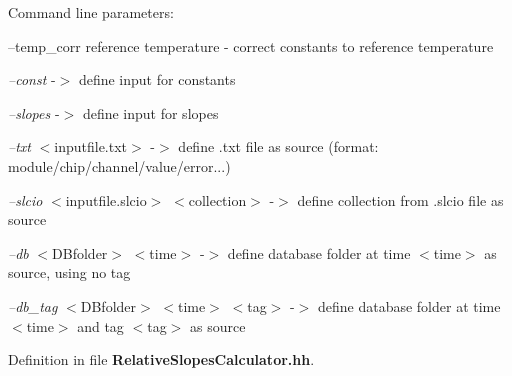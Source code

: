 Command line parameters\-: \begin{DoxyVerb}\e --temp_corr   \<reference temperature\> -\> correct constants to reference temperature\n
\end{DoxyVerb}
 \par
 {\itshape --const} -\/$>$ define input for constants\par
 {\itshape --slopes} -\/$>$ define input for slopes\par
\par
 {\itshape --txt} $<$inputfile.\-txt$>$ -\/$>$ define .txt file as source (format\-: module/chip/channel/value/error...)\par
 {\itshape --slcio} $<$inputfile.\-slcio$>$ $<$collection$>$ -\/$>$ define collection from .slcio file as source\par
 {\itshape --db} $<$D\-Bfolder$>$ $<$time$>$ -\/$>$ define database folder at time $<$time$>$ as source, using no tag\par
 {\itshape --db\-\_\-tag} $<$D\-Bfolder$>$ $<$time$>$ $<$tag$>$ -\/$>$ define database folder at time $<$time$>$ and tag $<$tag$>$ as source\par


Definition in file {\bf Relative\-Slopes\-Calculator.\-hh}.

